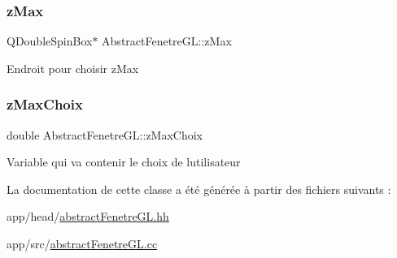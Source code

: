\subsubsection{\texorpdfstring{z\+Max}{zMax}}
{\footnotesize\ttfamily Q\+Double\+Spin\+Box$\ast$ Abstract\+Fenetre\+G\+L\+::z\+Max\hspace{0.3cm}{\ttfamily [protected]}}

Endroit pour choisir z\+Max \mbox{\label{classAbstractFenetreGL_a9cae32dc34af644ca71cdc80d0e77558}} 
\subsubsection{\texorpdfstring{z\+Max\+Choix}{zMaxChoix}}
{\footnotesize\ttfamily double Abstract\+Fenetre\+G\+L\+::z\+Max\+Choix\hspace{0.3cm}{\ttfamily [protected]}}

Variable qui va contenir le choix de l\textquotesingle{}utilisateur 

La documentation de cette classe a été générée à partir des fichiers suivants \+:\begin{DoxyCompactItemize}
\item 
app/head/\hyperlink{abstractFenetreGL_8hh}{abstract\+Fenetre\+G\+L.\+hh}\item 
app/src/\hyperlink{abstractFenetreGL_8cc}{abstract\+Fenetre\+G\+L.\+cc}\end{DoxyCompactItemize}
